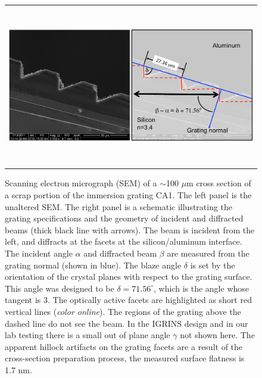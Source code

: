    \begin{figure}
   \begin{center}
   \begin{tabular}{c}
   \includegraphics[height=7cm]{chSPIE_2012_CA1/figs/CA1_SEM_cross3}
   \end{tabular}
   \end{center}
   \caption[CA1a SEM]{ \label{fig:CA1aSEM}  Scanning electron micrograph (SEM) of a $\sim$100 $\mu$m cross section of a scrap portion of the immersion grating CA1.  The left panel is the unaltered SEM.  The right panel is a schematic illustrating the grating specifications and the geometry of incident and diffracted beams (thick black line with arrows).  The beam is incident from the left, and diffracts at the facets at the silicon/aluminum interface.  The incident angle $\alpha$ and diffracted beam $\beta$ are measured from the grating normal (shown in blue).  The blaze angle $\delta$ is set by the orientation of the crystal planes with respect to the grating surface.  This angle was designed to be $\delta=71.56^\circ$, which is the angle whose tangent is 3.  The optically active facets are highlighted as short red vertical lines (\emph{color online}).  The regions of the grating above the dashed line do not see the beam.  In the IGRINS design and in our lab testing there is a small out of plane angle $\gamma$ not shown here.  The apparent hillock artifacts on the grating facets are a result of the cross-section preparation process, the measured\cite{2010SPIE.7739E.146W} surface flatness is 1.7 nm.}
   \end{figure} 

